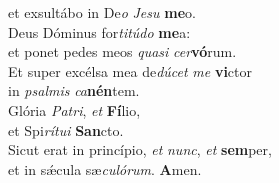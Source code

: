 \evenverse et exsultábo in De\textit{o} \textit{Je}\textit{su} \textbf{me}o.\\
\oddverse Deus Dóminus for\textit{ti}\textit{tú}\textit{do} \textbf{me}a:~\*\\
\oddverse et ponet pedes meos \textit{qua}\textit{si} \textit{cer}\textbf{vó}rum.\\
\evenverse Et super excélsa mea de\textit{dú}\textit{cet} \textit{me} \textbf{vi}ctor~\*\\
\evenverse in \textit{psal}\textit{mis} \textit{ca}\textbf{nén}tem.\\
\oddverse Glória \textit{Pa}\textit{tri}, \textit{et} \textbf{Fí}lio,~\*\\
\oddverse et Spi\textit{rí}\textit{tu}\textit{i} \textbf{San}cto.\\
\evenverse Sicut erat in princípio, \textit{et} \textit{nunc}, \textit{et} \textbf{sem}per,~\*\\
\evenverse et in sǽcula sæ\textit{cu}\textit{ló}\textit{rum}. \textbf{A}men.\\
